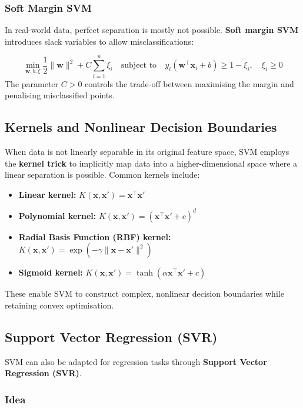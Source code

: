 \documentclass[9pt]{extarticle}
\begin{document}
\subsubsection*{Soft Margin SVM}

In real-world data, perfect separation is mostly not possible. \textbf{Soft margin SVM} introduces slack variables to allow misclassifications:

\[
\min_{\mathbf{w}, b, \xi} \frac{1}{2} \|\mathbf{w}\|^2 + C \sum_{i=1}^n \xi_i
\quad \text{subject to} \quad
y_i(\mathbf{w}^\top \mathbf{x}_i + b) \geq 1 - \xi_i, \quad \xi_i \geq 0
\]
The parameter $C > 0$ controls the trade-off between maximising the margin and penalising misclassified points.

\subsection{Kernels and Nonlinear Decision Boundaries}

When data is not linearly separable in its original feature space, 
SVM employs the \textbf{kernel trick} to implicitly map data 
into a higher-dimensional space where a linear separation is possible.
Common kernels include:

\begin{itemize}
    \item \textbf{Linear kernel:} $K(\mathbf{x}, \mathbf{x}') = \mathbf{x}^\top \mathbf{x}'$
    \item \textbf{Polynomial kernel:} $K(\mathbf{x}, \mathbf{x}') = (\mathbf{x}^\top \mathbf{x}' + c)^d$
    \item \textbf{Radial Basis Function (RBF) kernel:} $K(\mathbf{x}, \mathbf{x}') = \exp\left(-\gamma \|\mathbf{x} - \mathbf{x}'\|^2\right)$
    \item \textbf{Sigmoid kernel:} $K(\mathbf{x}, \mathbf{x}') = \tanh(\alpha \mathbf{x}^\top \mathbf{x}' + c)$
\end{itemize}
These enable SVM to construct complex, nonlinear decision boundaries while retaining convex optimisation.

\subsection{Support Vector Regression (SVR)}

SVM can also be adapted for regression tasks through \textbf{Support Vector Regression (SVR)}.

\subsubsection*{Idea}
\end{document}
